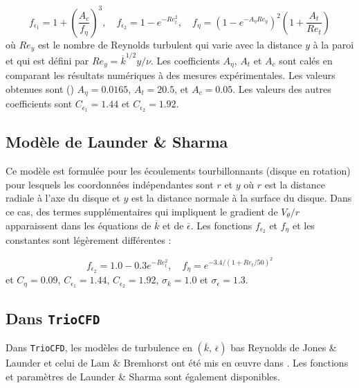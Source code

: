 \[
f_{\epsilon_{1}}=1+\left(\frac{A_{c}}{f_{\eta}}\right)^{3},\quad f_{\epsilon_{2}}=1-e^{-Re_{t}^{2}},\quad f_{\eta}=(1-e^{-A_{\eta}Re_{y}})^{2}\left(1+\frac{A_{t}}{Re_{t}}\right)
\]
o\`u $Re_{y}$ est le nombre de Reynolds turbulent qui varie avec la
distance $y$ \`a la paroi et qui est d\'efini par $Re_{y}=\overline{k}^{1/2}y/\nu$.
Les coefficients $A_{\eta}$, $A_{t}$ et $A_{c}$ sont cal\'es en comparant
les r\'esultats num\'eriques \`a des mesures exp\'erimentales. Les valeurs
obtenues sont (\cite[sec. 3.1]{Lam-Bremhorst_JFE1981}) $A_{\eta}=0.0165$,
$A_{t}=20.5$, et $A_{c}=0.05$. Les valeurs des autres coefficients
sont $C_{\epsilon_{1}}=1.44$ et $C_{\epsilon_{2}}=1.92$.


\subsection*{Mod\`ele de Launder \& Sharma \cite{Launder-Sharma_LettHMT1974}}

Ce mod\`ele est formul\'ee pour les \'ecoulements tourbillonnants (disque
en rotation) pour lesquels les coordonn\'ees ind\'ependantes sont $r$
et $y$ o\`u $r$ est la distance radiale \`a l'axe du disque et $y$
est la distance normale \`a la surface du disque. Dans ce cas, des termes
suppl\'ementaires qui impliquent le gradient de $V_{\theta}/r$ apparaissent
dans les \'equations de $\overline{k}$ et de $\overline{\epsilon}$.
Les fonctions $f_{\epsilon_{2}}$ et $f_{\eta}$ et les constantes
sont l\'eg\`erement diff\'erentes \cite[Eqs. (5), (6)]{Launder-Sharma_LettHMT1974}
:

\[
f_{\epsilon_{2}}=1.0-0.3e^{-Re_{t}^{2}},\quad f_{\eta}=e^{-3.4/(1+Re_{t}/50)^{2}}
\]
et \cite[Eqs. (5), (6) et valeurs au-dessous]{Launder-Sharma_LettHMT1974}
$C_{\eta}=0.09$, $C_{\epsilon_{1}}=1.44$, $C_{\epsilon_{2}}=1.92$,
$\sigma_{k}=1.0$ et $\sigma_{\epsilon}=1.3$.


\subsection*{Dans \texttt{TrioCFD}}

Dans \texttt{TrioCFD}, les mod\`eles de turbulence en $(\overline{k},\,\overline{\epsilon})$
\og bas Reynolds \fg{} de Jones \& Launder \cite{Jones-Launder_IJHMT1972}
et celui de Lam \& Bremhorst \cite{Lam-Bremhorst_JFE1981} ont \'et\'e
mis en \oe uvre dans \cite{Peybernes_LowReynolds_NT2016}. Les fonctions
et param\`etres de Launder \& Sharma \cite{Launder-Sharma_LettHMT1974}
sont \'egalement disponibles.


